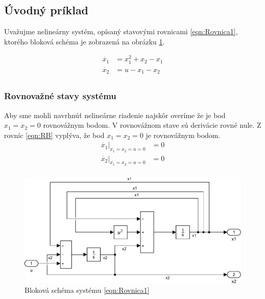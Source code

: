\documentclass[../main.tex]{subfiles}
\begin{document}
	
\subsection{Úvodný príklad}
Uvažujme nelineárny systém, opísaný stavovými rovnicami \ref{eqn:Rovnica1}, ktorého bloková schéma je zobrazená na obrázku \ref{fig:BlokovaSchemaPr1}. 

\begin{equation}
	\begin{aligned}
	\dot{x_1} &= x_1^2 + x_2 - x_1 \\
	\dot{x_2} &= u - x_1 - x_2 \\
	\end{aligned}
	\label{eqn:Rovnica1}
\end{equation}

\subsubsection{Rovnovažné stavy systému}
Aby sme mohli navrhnúť nelineárne riadenie najskôr overíme že je bod  $x_1 = x_2 = 0$ rovnovážnym bodom. V rovnovážnom stave sú derivácie rovné nule. Z rovníc \ref{eqn:RB} vyplýva, že bod $x_1 = x_2 = 0$ je rovnovážnym bodom.
\begin{equation}
\begin{aligned}
    \dot{x_1}|_{x_1 = x_2 = u = 0} &=  0 \\
\dot{x_2}|_{x_1 = x_2 = u = 0} &= 0 \\
\end{aligned}
\label{eqn:RB}
\end{equation}
\begin{figure}[H]
	\begin{center}\includegraphics[scale=0.8]{Rovnica1.pdf}\end{center}
	\caption{Bloková schéma systému \ref{eqn:Rovnica1}}
	\label{fig:BlokovaSchemaPr1}
\end{figure}
\end{document}
